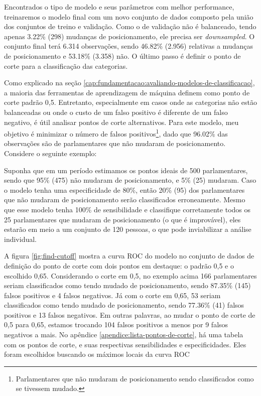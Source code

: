 \documentclass[a4paper,titlepage]{ppgi}\usepackage[]{graphicx}\usepackage[]{color}
\begin{document}
Encontrados o tipo de modelo e seus parâmetros com melhor performance,
treinaremos o modelo final com um novo conjunto de dados composto pela união
dos conjuntos de treino e validação. Como o de validação não é balanceado,
tendo apenas 3.22\%
(298) mudanças de
posicionamento, ele precisa ser \emph{downsampled}. O conjunto final terá
6.314 observações, sendo
46.82\%
(2.956) relativas a
mudanças de posicionamento e
53.18\%
(3.358) não. O último
passo é definir o ponto de corte para a classificação das categorias.

Como explicado na seção
\ref{cap:fundamentacao:avaliando-modelos-de-classificacao}, a maioria das
ferramentas de aprendizagem de máquina definem como ponto de corte padrão 0,5.
Entretanto, especialmente em casos onde as categorias não estão balanceadas ou
onde o custo de um falso positivo é diferente de um falso negativo, é útil
analisar pontos de corte alternativos. Para este modelo, meu objetivo é
minimizar o número de falsos positivos\footnote{Parlamentares que não mudaram
de posicionamento sendo classificados como se tivessem mudado.}, dado que
96.02\% das observações são de
parlamentares que não mudaram de posicionamento. Considere o seguinte exemplo:

Suponha que em um período estimamos os pontos ideais de 500 parlamentares,
sendo que 95\% (475) não mudaram de posicionamento, e 5\% (25) mudaram. Caso o
modelo tenha uma especificidade de 80\%, então 20\% (95) dos parlamentares que
não mudaram de posicionamento serão classificados erroneamente. Mesmo que esse
modelo tenha 100\% de sensibilidade e classifique corretamente todos os 25
parlamentares que mudaram de posicionamento (o que é improvável), eles estarão
em meio a um conjunto de 120 pessoas, o que pode inviabilizar a análise
individual.



A figura \ref{fig:find-cutoff} mostra a curva \gls{ROC} do modelo no conjunto de
dados de definição do ponto de corte com dois pontos em destaque: o padrão 0,5
e o escolhido 0,65. Considerando o corte em 0,5, no exemplo
acima 166 parlamentares seriam classificados como
tendo mudado de posicionamento, sendo 87.35\% (145) falsos positivos e
4 falsos negativos. Já com o corte em 0,65,
53 seriam classificados como tendo mudado de
posicionamento, sendo 77.36\% (41) falsos positivos e 13
falsos negativos.  Em outras palavras, ao mudar o ponto de corte de 0,5 para
0,65, estamos trocando 104 falsos
positivos a menos por 9 falsos negativos a mais.
No apêndice \ref{apendice:lista-pontos-de-corte}, há uma tabela com os pontos
de corte, e suas respectivas sensibilidades e especificidades. Eles foram
escolhidos buscando os máximos locais da curva \gls{ROC}
\end{document}
